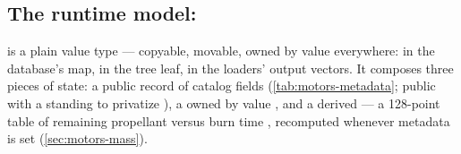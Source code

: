 \subsection{The runtime model: }\label{sec:motors-model}

  is a plain value type --- copyable,
movable, owned by value everywhere: in the database's map, in the  tree
leaf, in the loaders' output vectors. It composes three pieces of state: a public
 record of catalog fields 
(\cref{tab:motors-metadata}; public with a standing  to privatize
), a  owned by value
, and a derived  --- a 128-point table of
remaining propellant versus burn time , recomputed whenever
metadata is set (\cref{sec:motors-mass}).

